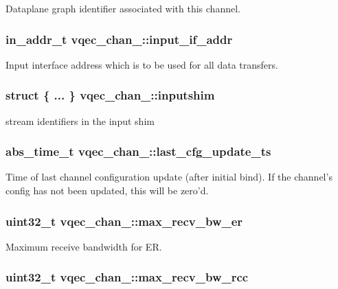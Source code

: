 Dataplane graph identifier associated with this channel. 
\subsubsection{\setlength{\rightskip}{0pt plus 5cm}in\_\-addr\_\-t \bf{vqec\_\-chan\_\-::input\_\-if\_\-addr}}\label{structvqec__chan___88791afaa82228ca7d934375a333ee92}


Input interface address which is to be used for all data transfers. 
\subsubsection{\setlength{\rightskip}{0pt plus 5cm}struct \{ ... \}   \bf{vqec\_\-chan\_\-::inputshim}}\label{structvqec__chan___4b4388aed074d4e59a3ecfb6e5f0472f}


stream identifiers in the input shim 
\subsubsection{\setlength{\rightskip}{0pt plus 5cm}abs\_\-time\_\-t \bf{vqec\_\-chan\_\-::last\_\-cfg\_\-update\_\-ts}}\label{structvqec__chan___08a9f0e95387a405be4a3ae03d90536b}


Time of last channel configuration update (after initial bind). If the channel's config has not been updated, this will be zero'd. 
\subsubsection{\setlength{\rightskip}{0pt plus 5cm}uint32\_\-t \bf{vqec\_\-chan\_\-::max\_\-recv\_\-bw\_\-er}}\label{structvqec__chan___6f19b0d1298b296db937fe1a31089cf4}


Maximum receive bandwidth for ER. 
\subsubsection{\setlength{\rightskip}{0pt plus 5cm}uint32\_\-t \bf{vqec\_\-chan\_\-::max\_\-recv\_\-bw\_\-rcc}}\label{structvqec__chan___2651ebee2905b51ed7a2b8cfc7605057}


